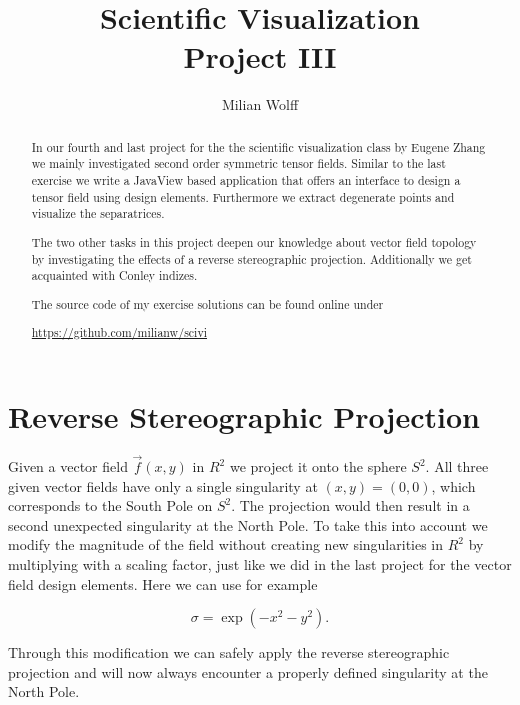 \documentclass[a4paper,10pt,notitlepage]{scrartcl}
\title{Scientific Visualization\\Project III}
\author{Milian Wolff}
\begin{document}
\maketitle

\begin{abstract}
In our fourth and last project for the the scientific visualization class
by Eugene Zhang we mainly investigated second order symmetric tensor fields.
Similar to the last exercise we write a JavaView based application that offers
an interface to design a tensor field using design elements. Furthermore we
extract degenerate points and visualize the separatrices.

The two other tasks in this project deepen our knowledge about vector field
topology by investigating the effects of a reverse stereographic projection.
Additionally we get acquainted with Conley indizes.

The source code of my exercise solutions can be found online under

\begin{center}\url{https://github.com/milianw/scivi}\end{center}
\end{abstract}

\begingroup
\let\clearpage\relax

\tableofcontents
\endgroup

\newpage

\section{Reverse Stereographic Projection}

Given a vector field $\vec{f}(x,y)$ in $R^2$ we project it onto the sphere
$S^2$. All three given vector fields have only a single singularity at $(x,y) =
(0,0)$, which corresponds to the South Pole on $S^2$. The projection would then
result in a second unexpected singularity at the North Pole. To take this into
account we modify the magnitude of the field without creating new singularities
in $R^2$ by multiplying with a scaling factor, just like we did in the last
project for the vector field design elements. Here we can use for example

\begin{equation}
 \sigma = \exp(-x^2-y^2).
\end{equation}

Through this modification we can safely apply the reverse stereographic
projection and will now always encounter a properly defined singularity at the
North Pole.
\end{document}
